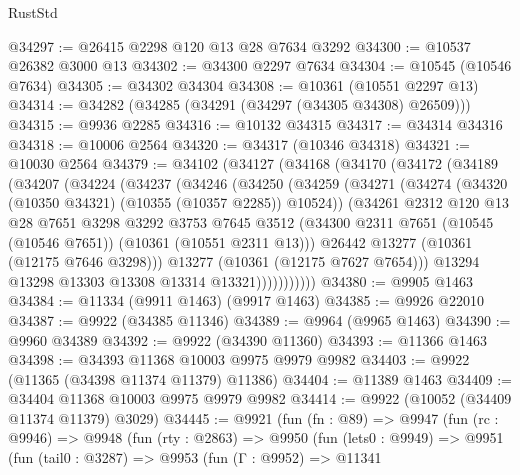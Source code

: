 \begin{lexlean}{RustStd}
\begin{coremodule}
@34297 := @26415 @2298 @120 @13 @28 @7634 @3292
@34300 := @10537 @26382 @3000 @13
@34302 := @34300 @2297 @7634
@34304 := @10545 (@10546 @7634)
@34305 := @34302 @34304
@34308 := @10361 (@10551 @2297 @13)
@34314 := @34282 (@34285 (@34291 (@34297 (@34305 @34308) @26509)))
@34315 := @9936 @2285
@34316 := @10132 @34315
@34317 := @34314 @34316
@34318 := @10006 @2564
@34320 := @34317 (@10346 @34318)
@34321 := @10030 @2564
@34379 := @34102
    (@34127
      (@34168
        (@34170
          (@34172
            (@34189
              (@34207
                (@34224
                  (@34237
                    (@34246
                      (@34250
                        (@34259
                          (@34271
                            (@34274 (@34320 (@10350 @34321) (@10355 (@10357 @2285)) @10524))
                            (@34261
                              @2312
                              @120
                              @13
                              @28
                              @7651
                              @3298
                              @3292
                              @3753
                              @7645
                              @3512
                              (@34300
                                @2311
                                @7651
                                (@10545 (@10546 @7651))
                                (@10361 (@10551 @2311 @13)))
                              @26442
                              @13277
                              (@10361 (@12175 @7646 @3298)))
                            @13277
                            (@10361 (@12175 @7627 @7654)))
                          @13294
                          @13298
                          @13303
                          @13308
                          @13314
                          @13321)))))))))))
@34380 := @9905 @1463
@34384 := @11334 (@9911 @1463) (@9917 @1463)
@34385 := @9926 @22010
@34387 := @9922 (@34385 @11346)
@34389 := @9964 (@9965 @1463)
@34390 := @9960 @34389
@34392 := @9922 (@34390 @11360)
@34393 := @11366 @1463
@34398 := @34393 @11368 @10003 @9975 @9979 @9982
@34403 := @9922 (@11365 (@34398 @11374 @11379) @11386)
@34404 := @11389 @1463
@34409 := @34404 @11368 @10003 @9975 @9979 @9982
@34414 := @9922 (@10052 (@34409 @11374 @11379) @3029)
@34445 := @9921
    (fun (fn : @89) =>
    @9947
      (fun (rc : @9946) =>
      @9948
        (fun (rty : @2863) =>
        @9950
          (fun (lets0 : @9949) =>
          @9951
            (fun (tail0 : @3287) =>
            @9953
              (fun (Γ : @9952) =>
              @11341

\end{coremodule}
\end{lexlean}

